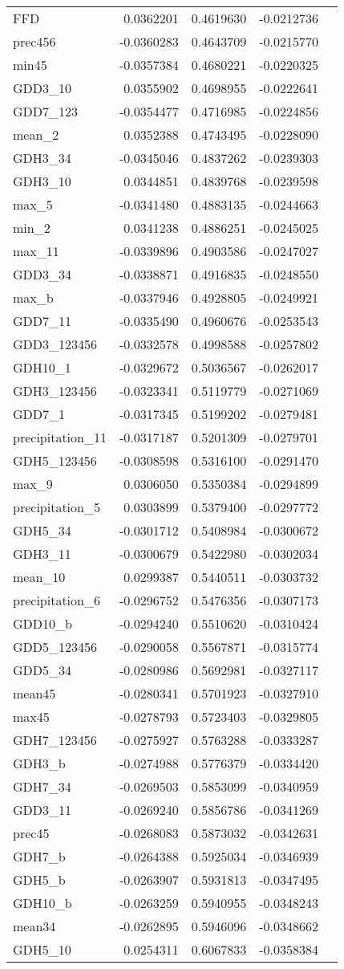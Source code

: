 \documentclass[]{article}
\begin{document}
\begin{longtable}[]{@{}lrrrl@{}}
FFD & 0.0362201 & 0.4619630 & -0.0212736 &\tabularnewline
prec456 & -0.0360283 & 0.4643709 & -0.0215770 &\tabularnewline
min45 & -0.0357384 & 0.4680221 & -0.0220325 &\tabularnewline
GDD3\_10 & 0.0355902 & 0.4698955 & -0.0222641 &\tabularnewline
GDD7\_123 & -0.0354477 & 0.4716985 & -0.0224856 &\tabularnewline
mean\_2 & 0.0352388 & 0.4743495 & -0.0228090 &\tabularnewline
GDH3\_34 & -0.0345046 & 0.4837262 & -0.0239303 &\tabularnewline
GDH3\_10 & 0.0344851 & 0.4839768 & -0.0239598 &\tabularnewline
max\_5 & -0.0341480 & 0.4883135 & -0.0244663 &\tabularnewline
min\_2 & 0.0341238 & 0.4886251 & -0.0245025 &\tabularnewline
max\_11 & -0.0339896 & 0.4903586 & -0.0247027 &\tabularnewline
GDD3\_34 & -0.0338871 & 0.4916835 & -0.0248550 &\tabularnewline
max\_b & -0.0337946 & 0.4928805 & -0.0249921 &\tabularnewline
GDD7\_11 & -0.0335490 & 0.4960676 & -0.0253543 &\tabularnewline
GDD3\_123456 & -0.0332578 & 0.4998588 & -0.0257802 &\tabularnewline
GDH10\_1 & -0.0329672 & 0.5036567 & -0.0262017 &\tabularnewline
GDH3\_123456 & -0.0323341 & 0.5119779 & -0.0271069 &\tabularnewline
GDD7\_1 & -0.0317345 & 0.5199202 & -0.0279481 &\tabularnewline
precipitation\_11 & -0.0317187 & 0.5201309 & -0.0279701 &\tabularnewline
GDH5\_123456 & -0.0308598 & 0.5316100 & -0.0291470 &\tabularnewline
max\_9 & 0.0306050 & 0.5350384 & -0.0294899 &\tabularnewline
precipitation\_5 & 0.0303899 & 0.5379400 & -0.0297772 &\tabularnewline
GDH5\_34 & -0.0301712 & 0.5408984 & -0.0300672 &\tabularnewline
GDH3\_11 & -0.0300679 & 0.5422980 & -0.0302034 &\tabularnewline
mean\_10 & 0.0299387 & 0.5440511 & -0.0303732 &\tabularnewline
precipitation\_6 & -0.0296752 & 0.5476356 & -0.0307173 &\tabularnewline
GDD10\_b & -0.0294240 & 0.5510620 & -0.0310424 &\tabularnewline
GDD5\_123456 & -0.0290058 & 0.5567871 & -0.0315774 &\tabularnewline
GDD5\_34 & -0.0280986 & 0.5692981 & -0.0327117 &\tabularnewline
mean45 & -0.0280341 & 0.5701923 & -0.0327910 &\tabularnewline
max45 & -0.0278793 & 0.5723403 & -0.0329805 &\tabularnewline
GDH7\_123456 & -0.0275927 & 0.5763288 & -0.0333287 &\tabularnewline
GDH3\_b & -0.0274988 & 0.5776379 & -0.0334420 &\tabularnewline
GDH7\_34 & -0.0269503 & 0.5853099 & -0.0340959 &\tabularnewline
GDD3\_11 & -0.0269240 & 0.5856786 & -0.0341269 &\tabularnewline
prec45 & -0.0268083 & 0.5873032 & -0.0342631 &\tabularnewline
GDH7\_b & -0.0264388 & 0.5925034 & -0.0346939 &\tabularnewline
GDH5\_b & -0.0263907 & 0.5931813 & -0.0347495 &\tabularnewline
GDH10\_b & -0.0263259 & 0.5940955 & -0.0348243 &\tabularnewline
mean34 & -0.0262895 & 0.5946096 & -0.0348662 &\tabularnewline
GDH5\_10 & 0.0254311 & 0.6067833 & -0.0358384 &\tabularnewline

\end{longtable}
\end{document}
